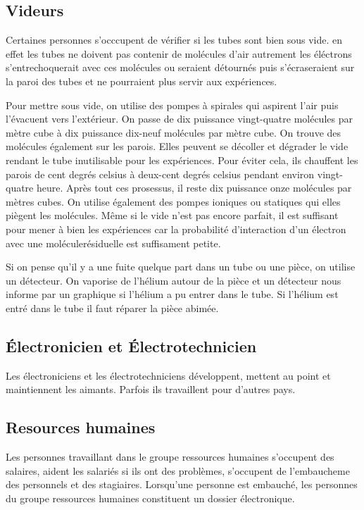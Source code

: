 		\subsection{Videurs}
			Certaines personnes s'occcupent de vérifier si les tubes sont bien sous vide. en effet les tubes ne doivent pas contenir de molécules d'air autrement les éléctrons s'entrechoquerait avec ces molécules ou seraient détournés puis s'écraseraient sur la paroi des tubes et ne pourraient plus servir aux expériences.
			
			Pour mettre sous vide, on utilise des pompes à spirales qui aspirent l'air puis l'évacuent vers l'extérieur. On passe de dix puissance vingt-quatre molécules par mètre cube à dix puissance dix-neuf molécules par mètre cube. On trouve des molécules également sur les parois. Elles peuvent se décoller et dégrader le vide rendant le tube inutilisable pour les expériences. Pour éviter cela,  ils chauffent les parois de cent degrés celsius à deux-cent degrés celsius pendant environ vingt-quatre heure. Après tout ces prosessus, il reste dix puissance onze molécules par mètres cubes. On utilise également des pompes ioniques ou statiques qui elles piègent les molécules. Même si le vide n'est pas encore parfait, il est suffisant pour mener à bien les expériences car la probabilité d'interaction d'un électron avec une moléculerésiduelle est suffisament petite. 

			Si on pense qu'il y a une fuite quelque part dans un tube ou une pièce, on utilise un détecteur. On vaporise de l'hélium autour de la pièce et un détecteur nous informe par un graphique si l'hélium a pu entrer dans le tube. Si l'hélium est entré dans le tube il faut réparer la pièce abimée.  
		
		\subsection{Électronicien et Électrotechnicien}
			Les électroniciens et les électrotechniciens développent, mettent au point et maintiennent les aimants. Parfois ils travaillent pour d'autres pays.
		
		\subsection{Resources humaines}
			Les personnes travaillant dans le groupe ressources humaines s'occupent des salaires, aident les salariés si ils ont des problèmes, s'occupent de l'embaucheme des personnels et des stagiaires. Lorsqu'une personne est embauché, les personnes du groupe ressources humaines constituent un dossier électronique. 

